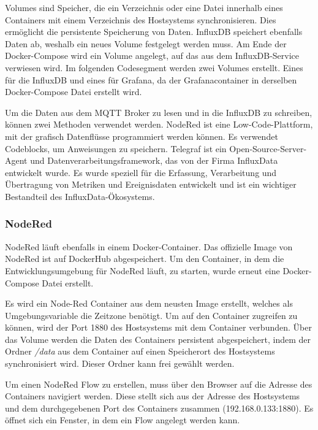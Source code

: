 \documentclass[a4paper, 12pt, oneside, toc=listofnumbered, bibliography=totoc]{scrbook}
\begin{document}
		Volumes sind Speicher, die ein Verzeichnis oder eine Datei innerhalb eines Containers mit einem Verzeichnis des Hostsystems synchronisieren. Dies ermöglicht die persistente Speicherung von Daten. InfluxDB speichert ebenfalls Daten ab, weshalb ein neues Volume festgelegt werden muss. Am Ende der Docker-Compose wird ein Volume angelegt, auf das aus dem InfluxDB-Service verwiesen wird. Im folgenden Codesegment werden zwei Volumes erstellt. Eines für die InfluxDB und eines für Grafana, da der Grafanacontainer in derselben Docker-Compose Datei erstellt wird.
		
		
		
		Um die Daten aus dem MQTT Broker zu lesen und in die InfluxDB zu schreiben, können zwei Methoden verwendet werden. NodeRed ist eine Low-Code-Plattform, mit der grafisch Datenflüsse programmiert werden können. Es verwendet Codeblocks, um Anweisungen zu speichern. Telegraf ist ein Open-Source-Server-Agent und Datenverarbeitungsframework, das von der Firma InfluxData entwickelt wurde. Es wurde speziell für die Erfassung, Verarbeitung und Übertragung von Metriken und Ereignisdaten entwickelt und ist ein wichtiger Bestandteil des InfluxData-Ökosystems. 
		
			\subsubsection{NodeRed}
			
			NodeRed läuft ebenfalls in einem Docker-Container. Das offizielle Image von NodeRed ist auf DockerHub abgespeichert. Um den Container, in dem die Entwicklungsumgebung für NodeRed läuft, zu starten, wurde erneut eine Docker-Compose Datei erstellt. 
			
			
			
			Es wird ein Node-Red Container aus dem neusten Image erstellt, welches als Umgebungsvariable die Zeitzone benötigt. Um auf den Container zugreifen zu können, wird der Port 1880 des Hostsystems mit dem Container verbunden. Über das Volume werden die Daten des Containers persistent abgespeichert, indem der Ordner \textit{/data} aus dem Container auf einen Speicherort des Hostsystems synchronisiert wird. Dieser Ordner kann frei gewählt werden.
			
			Um einen NodeRed Flow zu erstellen, muss über den Browser auf die Adresse des Containers navigiert werden. Diese stellt sich aus der Adresse des Hostsystems und dem durchgegebenen Port des Containers zusammen (192.168.0.133:1880). Es öffnet sich ein Fenster, in dem ein Flow angelegt werden kann.
			
\end{document}
